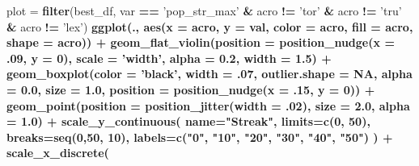 \documentclass[]{book}
\newenvironment{Shaded}{\begin{snugshade}}{\end{snugshade}}
\newcommand{\DataTypeTok}[1]{\textcolor[rgb]{0.13,0.29,0.53}{#1}}
\newcommand{\DecValTok}[1]{\textcolor[rgb]{0.00,0.00,0.81}{#1}}
\newcommand{\FloatTok}[1]{\textcolor[rgb]{0.00,0.00,0.81}{#1}}
\newcommand{\KeywordTok}[1]{\textcolor[rgb]{0.13,0.29,0.53}{\textbf{#1}}}
\newcommand{\NormalTok}[1]{#1}
\newcommand{\OperatorTok}[1]{\textcolor[rgb]{0.81,0.36,0.00}{\textbf{#1}}}
\newcommand{\OtherTok}[1]{\textcolor[rgb]{0.56,0.35,0.01}{#1}}
\newcommand{\StringTok}[1]{\textcolor[rgb]{0.31,0.60,0.02}{#1}}
\begin{document}
\begin{Shaded}
\begin{Highlighting}[]
\NormalTok{plot =}\StringTok{ }\KeywordTok{filter}\NormalTok{(best_df, var }\OperatorTok{==}\StringTok{ 'pop_str_max'} \OperatorTok{&}\StringTok{  }\NormalTok{acro }\OperatorTok{!=}\StringTok{ 'tor'} \OperatorTok{&}\StringTok{ }\NormalTok{acro }\OperatorTok{!=}\StringTok{ 'tru'} \OperatorTok{&}\StringTok{ }\NormalTok{acro }\OperatorTok{!=}\StringTok{ 'lex'}\NormalTok{) }\OperatorTok{%>%}
\StringTok{  }\KeywordTok{ggplot}\NormalTok{(., }\KeywordTok{aes}\NormalTok{(}\DataTypeTok{x =}\NormalTok{ acro, }\DataTypeTok{y =}\NormalTok{ val, }\DataTypeTok{color =}\NormalTok{ acro, }\DataTypeTok{fill =}\NormalTok{ acro, }\DataTypeTok{shape =}\NormalTok{ acro)) }\OperatorTok{+}
\StringTok{  }\KeywordTok{geom_flat_violin}\NormalTok{(}\DataTypeTok{position =} \KeywordTok{position_nudge}\NormalTok{(}\DataTypeTok{x =} \FloatTok{.09}\NormalTok{, }\DataTypeTok{y =} \DecValTok{0}\NormalTok{), }\DataTypeTok{scale =} \StringTok{'width'}\NormalTok{, }\DataTypeTok{alpha =} \FloatTok{0.2}\NormalTok{, }\DataTypeTok{width =} \FloatTok{1.5}\NormalTok{) }\OperatorTok{+}
\StringTok{  }\KeywordTok{geom_boxplot}\NormalTok{(}\DataTypeTok{color =} \StringTok{'black'}\NormalTok{, }\DataTypeTok{width =} \FloatTok{.07}\NormalTok{, }\DataTypeTok{outlier.shape =} \OtherTok{NA}\NormalTok{, }\DataTypeTok{alpha =} \FloatTok{0.0}\NormalTok{, }\DataTypeTok{size =} \FloatTok{1.0}\NormalTok{, }\DataTypeTok{position =} \KeywordTok{position_nudge}\NormalTok{(}\DataTypeTok{x =} \FloatTok{.15}\NormalTok{, }\DataTypeTok{y =} \DecValTok{0}\NormalTok{)) }\OperatorTok{+}
\StringTok{  }\KeywordTok{geom_point}\NormalTok{(}\DataTypeTok{position =} \KeywordTok{position_jitter}\NormalTok{(}\DataTypeTok{width =} \FloatTok{.02}\NormalTok{), }\DataTypeTok{size =} \FloatTok{2.0}\NormalTok{, }\DataTypeTok{alpha =} \FloatTok{1.0}\NormalTok{) }\OperatorTok{+}
\StringTok{  }\KeywordTok{scale_y_continuous}\NormalTok{(}
    \DataTypeTok{name=}\StringTok{"Streak"}\NormalTok{,}
    \DataTypeTok{limits=}\KeywordTok{c}\NormalTok{(}\DecValTok{0}\NormalTok{, }\DecValTok{50}\NormalTok{),}
    \DataTypeTok{breaks=}\KeywordTok{seq}\NormalTok{(}\DecValTok{0}\NormalTok{,}\DecValTok{50}\NormalTok{, }\DecValTok{10}\NormalTok{),}
    \DataTypeTok{labels=}\KeywordTok{c}\NormalTok{(}\StringTok{"0"}\NormalTok{, }\StringTok{"10"}\NormalTok{, }\StringTok{"20"}\NormalTok{, }\StringTok{"30"}\NormalTok{, }\StringTok{"40"}\NormalTok{, }\StringTok{"50"}\NormalTok{)}
\NormalTok{  ) }\OperatorTok{+}
\StringTok{  }\KeywordTok{scale_x_discrete}\NormalTok{(}
}
\end{Highlighting}
\end{Shaded}
\end{document}
